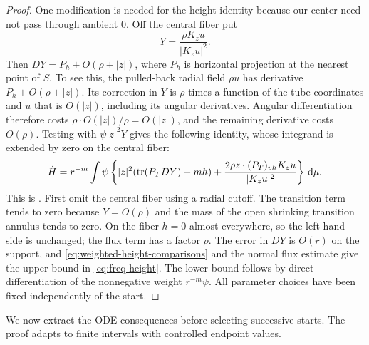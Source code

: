 \begin{proof}
One modification is needed for the height identity because our center
need not pass through ambient $0$. Off the central fiber put
\[
 Y=\frac{\rho K_zu}{|K_zu|^2}.
\]
Then $DY=P_h+O(\rho+|z|)$, where $P_h$ is horizontal projection
at the nearest point of $S$. To see this, the pulled-back radial field
$\rho u$ has derivative $P_h+O(\rho+|z|)$. Its correction in $Y$
is $\rho$ times a function of the tube coordinates and $u$ that is
$O(|z|)$, including its angular derivatives. Angular differentiation
therefore costs $\rho\cdot O(|z|)/\rho=O(|z|)$, and the remaining
derivative costs $O(\rho)$.
Testing with $\psi|z|^2Y$ gives the following identity, whose integrand
is extended by zero on the central fiber:
\begin{equation}\label{eq:interval-height-identity}
 \dot H=r^{-m}\int\psi\left\{
 |z|^2(\operatorname{tr}(P_TDY)-mh)
 +\frac{2\rho z\cdot(P_T)_{vh}K_zu}{|K_zu|^2}
 \right\}\,\mathrm d\mu .
\end{equation}
This is \cite[Equation~(8.18)]{AE}. First omit the central fiber
using a radial cutoff. The transition term tends to zero because
$Y=O(\rho)$ and the mass of the open shrinking transition annulus
tends to zero. On the fiber $h=0$ almost everywhere, so the left-hand
side is unchanged; the flux term has a factor $\rho$. The error in
$DY$ is $O(r)$ on the support, and
\eqref{eq:weighted-height-comparisons} and the normal flux estimate
give the upper bound in \eqref{eq:freq-height}. The lower bound follows
by direct differentiation of the nonnegative weight $r^{-m}\psi$.
All parameter choices have been fixed independently of the start.
\end{proof}

We now extract the ODE consequences before selecting successive starts.
The proof adapts \cite[Proposition~8.3]{AE} to finite intervals with
controlled endpoint values.

